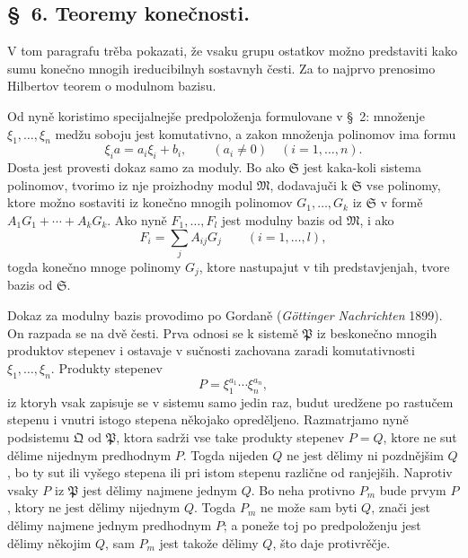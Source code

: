 \documentclass[11pt]{article}
\providecommand{\mM}{\mathfrak M}
\providecommand{\mS}{\mathfrak S}
\providecommand{\mP}{\mathfrak P}
\providecommand{\mQ}{\mathfrak Q}
\begin{document}

\setcounter{footnote}{14}
\subsection*{\S~6. Teoremy konečnosti.}

V tom paragrafu trěba pokazati, že vsaku grupu ostatkov možno predstaviti kako sumu konečno mnogih ireducibilnyh sostavnyh česti. Za to najprvo prenosimo Hilbertov teorem o modulnom bazisu.

Od nyně koristimo specijalnejše predpoloženja formulovane v \S~2: množenje \(\xi_1,\ldots,\xi_n\) medžu soboju jest komutativno, a zakon množenja polinomov ima formu
\begin{equation}
 \xi_i a=a_i\xi_i+b_i,
 \qquad (a_i\ne0)\quad(i=1,\ldots,n).
\tag{6}
\end{equation}
Dosta jest provesti dokaz samo za moduly. Bo ako \(\mS\) jest kaka-koli sistema polinomov, tvorimo iz nje proizhodny modul \(\mM\), dodavajuči k \(\mS\) vse polinomy, ktore možno sostaviti iz konečno mnogih polinomov \(G_1,\ldots,G_k\) iz \(\mS\) v formě \(A_1G_1+\cdots+A_kG_k\). Ako nyně \(F_1,\ldots,F_l\) jest modulny bazis od \(\mM\), i ako
\[
 F_i=\sum_j A_{ij}G_j\qquad(i=1,\ldots,l),
\]
togda konečno mnoge polinomy \(G_j\), ktore nastupajut v tih predstavjenjah, tvore bazis od \(\mS\).

Dokaz za modulny bazis provodimo po Gordaně (\emph{Göttinger Nachrichten} 1899). On razpada se na dvě česti. Prva odnosi se k sistemě \(\mP\) iz beskonečno mnogih produktov stepenev i ostavaje v sučnosti zachovana zaradi komutativnosti \(\xi_1,\ldots,\xi_n\). Produkty stepenev
\[
 P=\xi_1^{a_1}\cdots\xi_n^{a_n},
\]
iz ktoryh vsak zapisuje se v sistemu samo jedin raz, budut uredžene po rastučem stepenu i vnutri istogo stepena někojako opreděljeno. Razmatrjamo nyně podsistemu \(\mQ\) od \(\mP\), ktora sadrži vse take produkty stepenev \(P=Q\), ktore ne sut dělime nijednym predhodnym \(P\). Togda nijeden \(Q\) ne jest dělimy ni pozdnějšim \(Q\), bo ty sut ili vyšego stepena ili pri istom stepenu različne od ranjejših. Naprotiv vsaky \(P\) iz \(\mP\) jest dělimy najmene jednym \(Q\). Bo neha protivno \(P_m\) bude prvym \(P\), ktory ne jest dělimy nijednym \(Q\). Togda \(P_m\) ne može sam byti \(Q\), znači jest dělimy najmene jednym predhodnym \(P\); a poneže toj po predpoloženju jest dělimy někojim \(Q\), sam \(P_m\) jest takože dělimy \(Q\), što daje protivrěčje.
\end{document}
